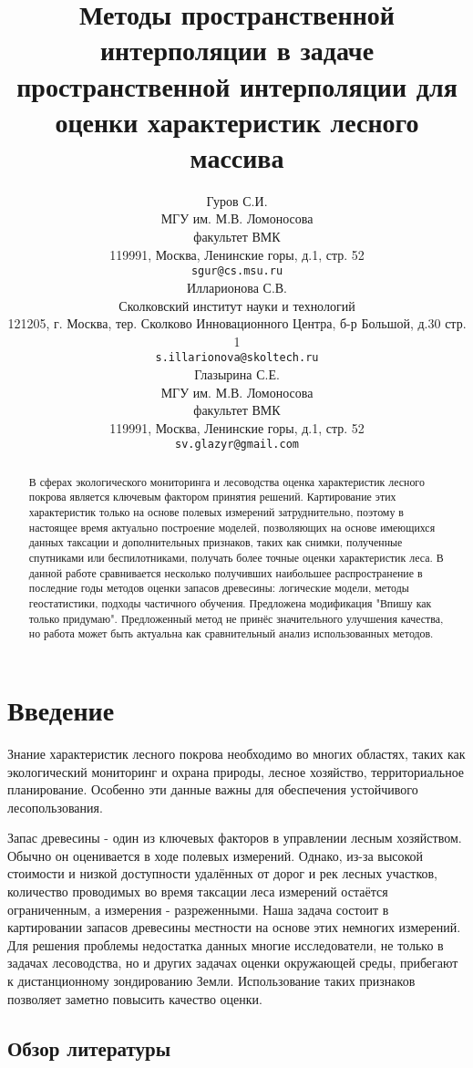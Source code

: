 \documentclass{article}
\title{Методы пространственной интерполяции в задаче пространственной интерполяции для оценки характеристик лесного массива}
\author{Гуров С.И.\\
	МГУ им. М.В. Ломоносова\\
	факультет ВМК\\
        119991, Москва, Ленинские горы, д.1, стр. 52\\
	\texttt{sgur@cs.msu.ru} \\
	\And
	  Илларионова С.В.\\
	  Сколковский институт науки и технологий\\
	121205, г. Москва, тер. Сколково Инновационного Центра, б-р Большой, д.30 стр. 1\\
	\texttt{s.illarionova@skoltech.ru} \\
    \And
    Глазырина С.Е. \\
	МГУ им. М.В. Ломоносова\\
	факультет ВМК\\
        119991, Москва, Ленинские горы, д.1, стр. 52\\
	\texttt{sv.glazyr@gmail.com} \\
}
\date{}
\begin{document}
\maketitle

\begin{abstract}
В сферах экологического мониторинга и лесоводства оценка характеристик лесного покрова является ключевым фактором принятия решений. Картирование этих характеристик только на основе полевых измерений затруднительно, поэтому в настоящее время актуально построение моделей, позволяющих на основе имеющихся данных таксации и дополнительных признаков, таких как снимки, полученные спутниками или беспилотниками, получать более точные оценки характеристик леса. В данной работе сравнивается несколько получивших наибольшее распространение в последние годы методов оценки запасов древесины: логические модели, методы геостатистики, подходы частичного обучения. Предложена модификация "Впишу как только придумаю". Предложенный метод не принёс значительного улучшения качества, но работа может быть актуальна как сравнительный анализ использованных методов.
\end{abstract}



\section*{Введение}
Знание характеристик лесного покрова необходимо во многих областях, таких как экологический мониторинг и охрана природы, лесное хозяйство, территориальное планирование. Особенно эти данные важны для обеспечения устойчивого лесопользования.

Запас древесины - один из ключевых факторов в управлении лесным хозяйством. Обычно он оценивается в ходе полевых измерений. Однако, из-за высокой стоимости и низкой доступности удалённых от дорог и рек лесных участков, количество проводимых во время таксации леса измерений остаётся ограниченным, а измерения - разреженными. Наша задача состоит в картировании запасов древесины местности на основе этих немногих измерений. Для решения проблемы недостатка данных многие исследователи, не только в задачах лесоводства, но и других задачах оценки окружающей среды, прибегают к дистанционному зондированию Земли. Использование таких признаков позволяет заметно повысить качество оценки.

\subsection*{Обзор литературы}
\end{document}
